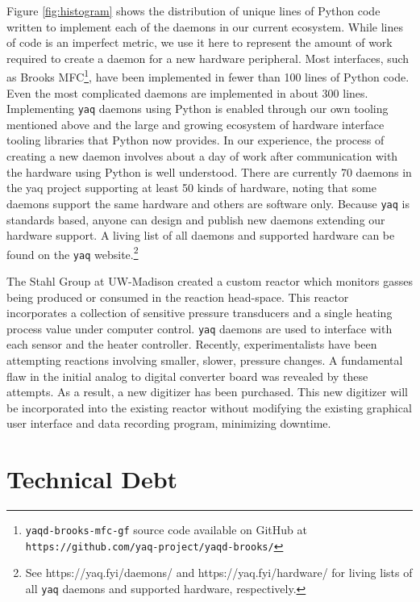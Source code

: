\documentclass[aip, amsmath, amssymb, reprint,]{revtex4-2}
\newcommand\yaq{\texttt{yaq}}
\begin{document}
Figure \ref{fig:histogram} shows the distribution of unique lines of Python code written to implement each of the daemons in our current ecosystem.
While lines of code is an imperfect metric, we use it here to represent the amount of work required to create a daemon for a new hardware peripheral.
Most interfaces, such as Brooks MFC\footnote{\texttt{yaqd-brooks-mfc-gf} source code available on GitHub at \texttt{https://github.com/yaq-project/yaqd-brooks/}}, have been implemented in fewer than 100 lines of Python code.
Even the most complicated daemons are implemented in about 300 lines.
Implementing \yaq{} daemons using Python is enabled through our own tooling mentioned above and the large and growing ecosystem of hardware interface tooling libraries that Python now provides\cite{pyserial, pyusb, pyvisa, pymodbus}.
In our experience, the process of creating a new daemon involves about a day of work after communication with the hardware using Python is well understood.
There are currently 70 daemons in the yaq project supporting at least 50 kinds of hardware, noting that some daemons support the same hardware and others are software only.
Because \yaq{} is standards based, anyone can design and publish new daemons extending our hardware support.
A living list of all daemons and supported hardware can be found on the \yaq{} website.\footnote{See https://yaq.fyi/daemons/ and https://yaq.fyi/hardware/ for living lists of all \yaq{} daemons and supported hardware, respectively.}

The Stahl Group at UW-Madison created a custom reactor which monitors gasses being produced or consumed in the reaction head-space.  \cite{SalazarChaseA2021a}
This reactor incorporates a collection of sensitive pressure transducers and a single heating process value under computer control.
\yaq{} daemons are used to interface with each sensor and the heater controller.
Recently, experimentalists have been attempting reactions involving smaller, slower, pressure changes.
A fundamental flaw in the initial analog to digital converter board was revealed by these attempts.
As a result, a new digitizer has been purchased.
This new digitizer will be incorporated into the existing reactor without modifying the existing graphical user interface and data recording program, minimizing downtime.

\section{Technical Debt}
\end{document}
